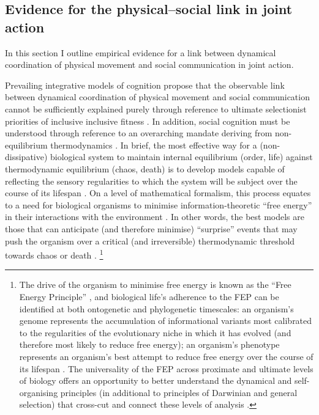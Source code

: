 \begin{CJK}{UTF8}{gbsn}
\subsection{Evidence for the physical--social link in joint action}
In this section I outline empirical evidence for a link between dynamical coordination of physical movement and social communication in joint action.




Prevailing integrative models of cognition propose that the observable link between dynamical coordination of physical movement and social communication cannot be sufficiently explained purely through reference to ultimate selectionist priorities of inclusive inclusive fitness \cite{Badcock2012}.  In addition, social cognition must be understood through reference to an overarching mandate deriving from non-equilibrium thermodynamics \citep{Schrodinger1944}.  In brief, the most effective way for a (non-dissipative) biological system to maintain internal equilibrium (order, life) against thermodynamic equilibrium (chaos, death) is to develop models capable of reflecting the sensory regularities to which the system will be subject over the course of its lifespan \citep{Conant1970,Yufik2016}. On a level of mathematical formalism, this process equates to a need for biological organisms to minimise information-theoretic ``free energy'' in their interactions with the environment \citep{Friston2006,Ramstead2017,Yufik2017}.  In other words, the best models are those that can anticipate (and therefore minimise) ``surprise'' events that may push the organism over a critical (and irreversible) thermodynamic threshold towards chaos or death \citep[here surprise can be understood as a rough equivalent of free energy, see][]{Friston2013}.
  \footnote{The drive of the organism to minimise free energy is known as the ``Free Energy Principle'' \citep[hereafter FEP; see][]{Friston2010}, and biological life's adherence to the FEP can be identified at both ontogenetic and phylogenetic timescales: an organism's genome represents the accumulation of informational variants most calibrated to the regularities of the evolutionary niche in which it has evolved (and therefore most likely to reduce free energy); an organism's phenotype represents an organism's best attempt to reduce free energy over the course of its lifespan \citep{Ramstead2017}.  The universality of the FEP across proximate and ultimate levels of biology offers an opportunity to better understand the dynamical and self-organising principles (in additional to principles of Darwinian and general selection) that cross-cut and connect these levels of analysis \citep{Caporael2001,Badcock2012,Laland2015,Ramstead2017}.}


\end{CJK}
